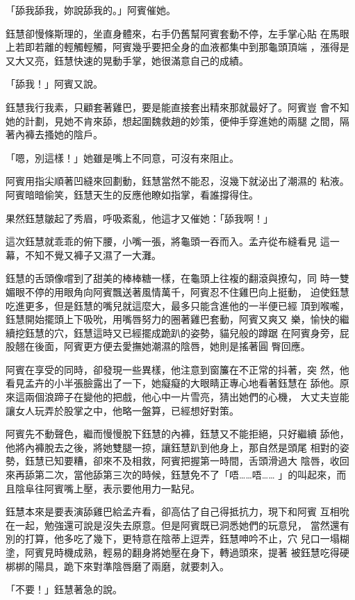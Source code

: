 「舔我舔我，妳說舔我的。」阿賓催她。

鈺慧卻慢條斯理的，坐直身體來，右手仍舊幫阿賓套動不停，左手掌心貼
在馬眼上若即若離的輕觸輕觸，阿賓幾乎要把全身的血液都集中到那龜頭頂端
，漲得是又大又亮，鈺慧快速的晃動手掌，她很滿意自己的成績。

「舔我！」阿賓又說。

鈺慧我行我素，只顧套著雞巴，要是能直接套出精來那就最好了。阿賓豈
會不知她的計劃，見她不肯來舔，想起圍魏救趙的妙策，便伸手穿進她的兩腿
之間，隔著內褲去搔她的陰戶。

「嗯，別這樣！」她雖是嘴上不同意，可沒有來阻止。

阿賓用指尖順著凹縫來回劃動，鈺慧當然不能忍，沒幾下就泌出了潮濕的
粘液。阿賓暗暗偷笑，鈺慧天生的反應他瞭如指掌，看誰撐得住。

果然鈺慧皺起了秀眉，呼吸紊亂，他這才又催她：「舔我啊！」

這次鈺慧就乖乖的俯下腰，小嘴一張，將龜頭一吞而入。孟卉從布縫看見
這一幕，不知不覺又褲子又濕了一大灘。

鈺慧的舌頭像嚐到了甜美的棒棒糖一樣，在龜頭上往複的翻滾與撩勾，同
時一雙媚眼不停的用眼角向阿賓飄送著風情萬千，阿賓忍不住雞巴向上挺動，
迫使鈺慧吃進更多，但是鈺慧的嘴兒就這麼大，最多只能含進他的一半便已經
頂到喉嚨，鈺慧開始擺頭上下吸吮，用嘴唇努力的圈著雞巴套動，阿賓又爽又
樂，愉快的繼續挖鈺慧的穴，鈺慧這時又已經擺成跪趴的姿勢，貓兒般的蹲踞
在阿賓身旁，屁股翹在後面，阿賓更方便去愛撫她潮濕的陰唇，她則是搖著圓
臀回應。

阿賓在享受的同時，卻發現一些異樣，他注意到窗簾在不正常的抖著，突
然，他看見孟卉的小半張臉露出了一下，她癡癡的大眼睛正專心地看著鈺慧在
舔他。原來這兩個浪蹄子在變他的把戲，他心中一片雪亮，猜出她們的心機，
大丈夫豈能讓女人玩弄於股掌之中，他略一盤算，已經想好對策。

阿賓先不動聲色，繼而慢慢脫下鈺慧的內褲，鈺慧又不能拒絕，只好繼續
舔他，他將內褲脫去之後，將她雙腿一掠，讓鈺慧趴到他身上，那自然是頭尾
相對的姿勢，鈺慧已知要糟，卻來不及相救，阿賓把握第一時間，舌頭滑過大
陰唇，收回來再舔第二次，當他舔第三次的時候，鈺慧免不了「唔……唔……
」的叫起來，而且陰阜往阿賓嘴上壓，表示要他用力一點兒。

鈺慧本來是要表演舔雞巴給孟卉看，卻高估了自己得抵抗力，現下和阿賓
互相吮在一起，勉強還可說是沒失去原意。但是阿賓既已洞悉她們的玩意兒，
當然還有別的打算，他多吃了幾下，更特意在陰蒂上逗弄，鈺慧呻吟不止，穴
兒口一塌糊塗，阿賓見時機成熟，輕易的翻身將她壓在身下，轉過頭來，提著
被鈺慧吃得硬梆梆的陽具，跪下來對準陰唇磨了兩磨，就要刺入。

「不要！」鈺慧著急的說。

